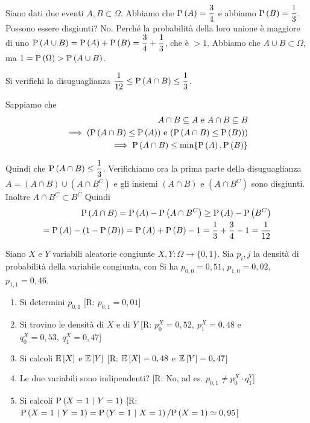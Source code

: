 \begin{exrc}
	Siano dati due eventi $A,B \subset \Omega$. Abbiamo che $ \text{P}\left(A\right) = \dfrac{3}{4} $ e abbiamo $ \text{P}\left(B\right) = \dfrac{1}{3} $. Possono essere disgiunti? No. Perch\'e la probabilit\`a  della loro unione \`e maggiore di uno $ \text{P}\left(A \cup B\right) = \text{P}\left(A\right) + \text{P}\left(B\right) = \dfrac{3}{4} + \dfrac{1}{3} $, che \`e $ > 1 $. Abbiamo che $ A \cup B \subset \Omega $, ma $ 1 = \text{P}\left(\Omega\right) > \text{P}\left(A \cup B\right) $.
    
    Si verifichi la disuguaglianza $ \dfrac{1}{12} \leq \text{P}\left(A \cap B\right) \leq \dfrac{1}{3} $.

    Sappiamo che
    \begin{equation*}
    \begin{aligned}
        A \cap B \subseteq A \text{ e } A \cap B \subseteq B \\
        \implies (\text{P}\left(A \cap B\right) \leq \text{P}\left(A\right)) \text{ e } (\text{P}\left(A \cap B\right) \leq \text{P}\left(B\right))) \\
    \implies \text{P}\left(A \cap B\right) \leq \min\{\text{P}\left(A\right), \text{P}\left(B\right)\} \\
    \end{aligned} 
    \end{equation*}
    
	Quindi che $ \text{P}\left(A \cap B\right) \leq \dfrac{1}{3} $. Verifichiamo ora la prima parte della disuguaglianza
	$A = (A \cap B) \cup (A \cap B^C) $ e gli insiemi $(A \cap B)$ e $(A \cap B^C) $ sono disgiunti.
	Inoltre $A \cap B^C\subset B^C$
    Quindi
    \begin{equation*}
    \begin{aligned}
    \text{P}\left(A \cap B\right) = \text{P}\left(A\right) - \text{P}\left(A \cap B^C\right) \geq \text{P}\left(A\right) - \text{P}\left(B^C\right) \\
    = \text{P}\left(A\right) - (1-\text{P}\left(B\right))
    = \text{P}\left(A\right) + \text{P}\left(B\right) - 1 = \dfrac{1}{3} + \dfrac{3}{4} - 1 = \dfrac{1}{12}
    \end{aligned}
    \end{equation*}
\end{exrc} 
\begin{exrc}
    Siano $X$ e $Y$ variabili aleatorie congiunte $X,Y:\Omega \rightarrow \{0,1\}$.
    Sia $p_i,j$ la densit\`a di probabilit\`a della variabile congiunta, con
    Si ha $p_{0,0}=0,51$, $p_{1,0}=0,02$, $p_{1,1}=0,46$.
    \begin{enumerate}
    \item Si determini $p_{0,1}$ [R: $p_{0,1}=0,01$]
    \item Si trovino le densit\`a di $X$ e di $Y$  [R: $p_0^X=0,52,\ p_1^X=0,48$ e
    $q_0^X=0,53,\ q_1^X=0,47$]
    \item Si calcoli $\mathbb{E}\left[X\right]$ e $\mathbb{E}\left[Y\right]$  [R: $\mathbb{E}\left[X\right]=0,48$ e $\mathbb{E}\left[Y\right]=0,47$]
    \item Le due variabili sono indipendenti? [R: No, ad es. $p_{0,1}\neq p_0^X\cdot q_1^Y$]
    \item Si calcoli $\text{P}\left(X=1\  |\ Y=1\right)$ [R: $\p{X=1\  |\ Y=1}=\p{Y=1\  |\ X=1}/\p{X=1}\simeq 0,95$]
    \end{enumerate}
    \end{exrc}
    
